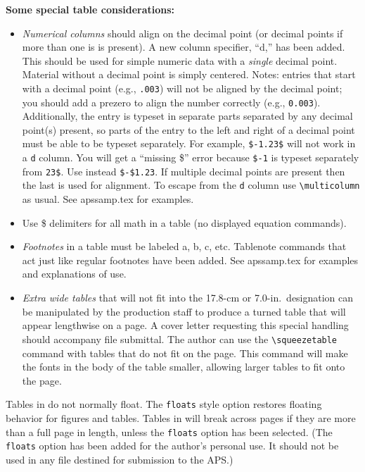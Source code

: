 {\bf Some special table considerations:}
\begin{itemize}

\item {\em Numerical columns\/} should align on the decimal point (or
decimal points if more than one is is present). A new column specifier,
``d,'' has been added. This should be used for simple numeric data with a
{\em single\/} decimal point. Material without a decimal point is simply
centered. Notes: entries that start with a decimal point (e.g.,
\verb+.003+) will not be aligned by the decimal point; you should add a
prezero to align the number correctly (e.g., \verb+0.003+). Additionally,
the entry is typeset in separate parts separated by any decimal point(s)
present, so parts of the entry to the left and right of a decimal point
must be able to be typeset separately. For example, \verb+$-1.23$+ will not
work in a \verb+d+ column. You will get a ``missing \$'' error because
\verb+$-1+ is typeset separately from \verb+23$+. Use instead
\verb+$-$1.23+. If multiple decimal points are present then the last is
used for alignment. To escape from the \verb+d+ column use
\verb+\multicolumn+ as usual. See apssamp.tex for examples.

\item Use \$ delimiters for all math in a table (no displayed equation
commands).

\item {\em  Footnotes\/} in a table must be labeled a, b, c, etc. Tablenote
commands that act just like regular footnotes have been added.  See
apssamp.tex for examples and explanations of use.

\item {\em Extra wide tables\/}
that will not fit into the 17.8-cm or 7.0-in.\ designation can be
manipulated by the production staff to produce a turned table that will
appear lengthwise on a page.  A cover letter requesting this special
handling should accompany file submittal. The author can use the
\verb+\squeezetable+ command with tables that do not fit on the page. This
command will make the fonts in the body of the table smaller, allowing
larger tables to fit onto the page.

\end{itemize}

Tables in \REVTeX{} do not normally float. The \verb+floats+ style option
restores floating behavior for figures and tables. Tables in \REVTeX{} will
break across pages if they are more than a full page in length, unless the
\verb+floats+ option has been selected. (The \verb+floats+ option has been
added for the author's personal use. It should not be used in any file
destined for submission to the APS.)



